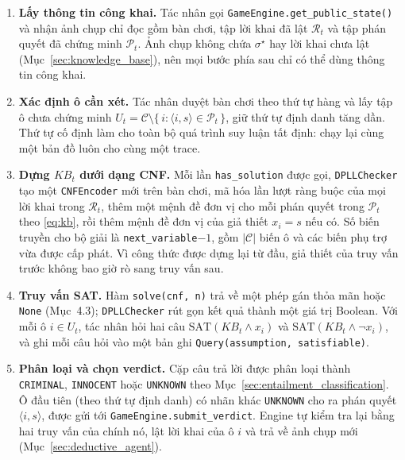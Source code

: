 \begin{sloppypar}
\begin{enumerate}
  \item \textbf{Lấy thông tin công khai.} Tác nhân gọi
    \texttt{GameEngine.get\_public\_state()} và nhận ảnh chụp chỉ đọc gồm bàn
    chơi, tập lời khai đã lật $\mathcal{R}_t$ và tập phán quyết đã chứng minh
    $\mathcal{P}_t$. Ảnh chụp không chứa $\sigma^\star$ hay lời khai chưa lật
    (Mục~\ref{sec:knowledge_base}), nên mọi bước phía sau chỉ có thể dùng
    thông tin công khai.
  \item \textbf{Xác định ô cần xét.} Tác nhân duyệt bàn chơi theo thứ tự hàng
    và lấy tập ô chưa chứng minh
    $U_t = \mathcal{C} \setminus \{\, i : \langle i, s\rangle \in \mathcal{P}_t \,\}$,
    giữ thứ tự định danh tăng dần. Thứ tự cố định làm cho toàn bộ quá trình
    suy luận tất định: chạy lại cùng một bản đồ luôn cho cùng một trace.
  \item \textbf{Dựng $\mathit{KB}_t$ dưới dạng CNF.} Mỗi lần
    \texttt{has\_solution} được gọi, \texttt{DPLLChecker} tạo một
    \texttt{CNFEncoder} mới trên bàn chơi, mã hóa lần lượt ràng buộc của mọi lời
    khai trong $\mathcal{R}_t$, thêm một mệnh đề đơn vị cho mỗi phán quyết trong
    $\mathcal{P}_t$ theo \eqref{eq:kb}, rồi thêm mệnh đề đơn vị của giả thiết
    $x_i = s$ nếu có. Số biến truyền cho bộ giải là
    \texttt{next\_variable}$-1$, gồm $|\mathcal{C}|$ biến ô và các biến phụ
    trợ vừa được cấp phát. Vì công thức được dựng lại từ đầu, giả thiết của
    truy vấn trước không bao giờ rò sang truy vấn sau.
  \item \textbf{Truy vấn SAT.} Hàm \texttt{solve(cnf, n)} trả về một phép gán
    thỏa mãn hoặc \texttt{None} (Mục~4.3); \texttt{DPLLChecker} rút gọn kết quả
    thành một giá trị Boolean. Với mỗi ô $i \in U_t$, tác nhân hỏi hai câu
    $\mathrm{SAT}(\mathit{KB}_t \land x_i)$ và
    $\mathrm{SAT}(\mathit{KB}_t \land \neg x_i)$, và ghi mỗi câu hỏi vào một
    bản ghi \texttt{Query(assumption, satisfiable)}.
  \item \textbf{Phân loại và chọn verdict.} Cặp câu trả lời được phân loại
    thành \texttt{CRIMINAL}, \texttt{INNOCENT} hoặc \texttt{UNKNOWN} theo
    Mục~\ref{sec:entailment_classification}. Ô đầu tiên (theo thứ tự định danh)
    có nhãn khác \texttt{UNKNOWN} cho ra phán quyết $\langle i, s\rangle$, được
    gửi tới \texttt{GameEngine.submit\_verdict}. Engine tự kiểm tra lại bằng hai
    truy vấn của chính nó, lật lời khai của ô $i$ và trả về ảnh chụp mới
    (Mục~\ref{sec:deductive_agent}).
\end{enumerate}


\end{sloppypar}
